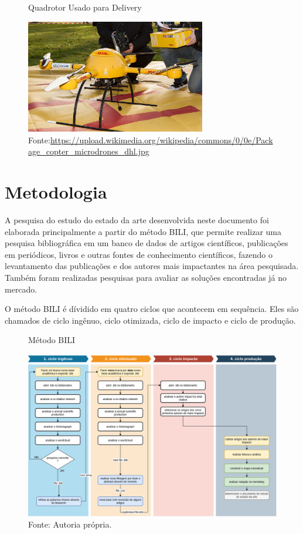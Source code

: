 \begin{figure} [h!]	
  \centering
  {
  \caption{Quadrotor Usado para Delivery}
  \includegraphics[width=0.7\textwidth]{Figures/Package_copter_microdrones_dhl.jpg}
  \caption*{Fonte:\url{https://upload.wikimedia.org/wikipedia/commons/0/0e/Package_copter_microdrones_dhl.jpg}}
  \label{fig:delivery}
  }
\end{figure}

\chapter{Metodologia}
\label{chap:metodologia}
A pesquisa do estudo do estado da arte desenvolvida neste documento foi elaborada principalmente a partir do método BILI, que permite realizar uma pesquisa bibliográfica em um banco de dados de artigos científicos, publicações em periódicos, livros e outras fontes de conhecimento científicos, fazendo o levantamento das publicações e dos autores mais impactantes na área pesquisada. Também foram realizadas pesquisas para avaliar as soluções encontradas já no mercado.

O método BILI é dívidido em quatro ciclos que acontecem em sequência. Eles são chamados de ciclo ingênuo, ciclo otimizada, ciclo de impacto e ciclo de produção.



\begin{figure} [h!]	
  \centering
  \caption{Método BILI}
  \includegraphics[width=1\textwidth]{Figures/bili.png}
  \caption*{Fonte: Autoria própria.}
  \label{fig:QFD}
\end{figure}

